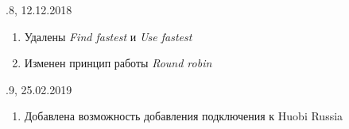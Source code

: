 \vspace{5mm}

.8, 12.12.2018
\begin{enumerate}
	\item Удалены \textit{Find fastest} и \textit{Use fastest}
	\item Изменен принцип работы \textit{Round robin}
\end{enumerate}

\vspace{5mm}

.9, 25.02.2019
\begin{enumerate}
	\item Добавлена возможность добавления подключения к Huobi Russia
\end{enumerate}

